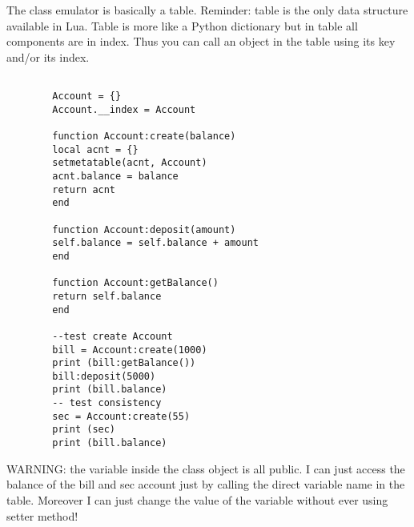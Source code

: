 \documentclass{article}
\begin{document}
    The class emulator is basically a table. Reminder: table is the only data structure available in Lua.
    Table is more like a Python dictionary but in table all components are in index. Thus you can call an object in the table using its key and/or its index.
    \begin{lstlisting}

        Account = {}
        Account.__index = Account

        function Account:create(balance)
        local acnt = {}
        setmetatable(acnt, Account)
        acnt.balance = balance
        return acnt
        end

        function Account:deposit(amount)
        self.balance = self.balance + amount
        end

        function Account:getBalance()
        return self.balance
        end

        --test create Account
        bill = Account:create(1000)
        print (bill:getBalance())
        bill:deposit(5000)
        print (bill.balance)
        -- test consistency
        sec = Account:create(55)
        print (sec)
        print (bill.balance)
    \end{lstlisting}
    WARNING: the variable inside the class object is all public. I can just access the balance of the bill and sec account just by calling the direct variable name in the table. 
    Moreover I can just change the value of the variable without ever using setter method!
    
\end{document}
